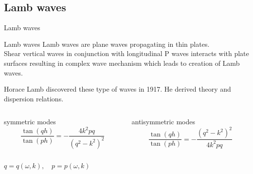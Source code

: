 \documentclass[10pt,aspectratio=169]{beamer} %
\begin{document}
\subsection{Lamb waves}
\begin{frame}{Lamb waves}
	\begin{alertblock}{Lamb waves}	
		Lamb waves are plane waves propagating in thin plates.\\
		Shear vertical waves in conjunction with longitudinal P waves interacts with plate surfaces resulting in complex wave mechanism which leads to creation of Lamb waves.
	\end{alertblock}
	Horace Lamb discovered these type of waves in 1917.
	He derived theory and dispersion relations.
	\begin{columns}[T]
		\begin{column}{0.5\textwidth}
			\centering
			symmetric modes
			\begin{equation*}
				\frac{\tan(q h)}{\tan(p h)} = -\frac{4 k^2 p q}{\left(q^2 - k^2\right)^2}
			\end{equation*}
		\end{column}
		\begin{column}{0.5\textwidth}
			\centering
			antisymmetric modes
			\begin{equation*}
				\frac{\tan(q h)}{\tan(p h)} = -\frac{\left(q^2 - k^2\right)^2}{4 k^2 p q}
			\end{equation*}
		\end{column}
	\end{columns}
	
	\centering
	\(q=q(\omega,k), \quad p=p(\omega,k) \)
\end{frame}
\note{
	
}
\end{document}

